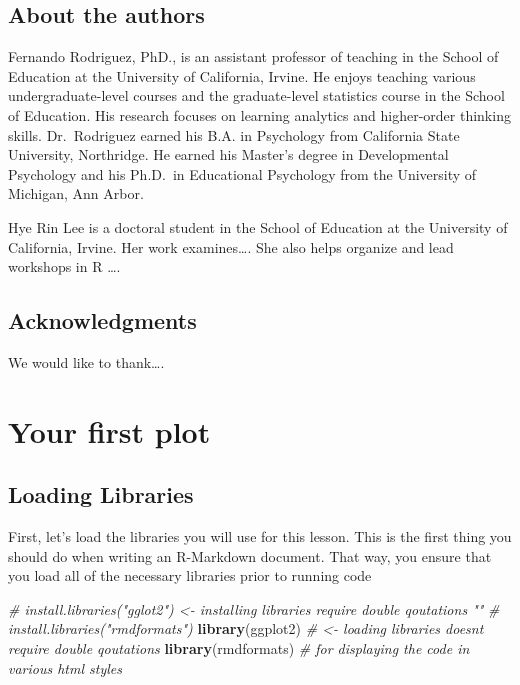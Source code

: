 \documentclass[
]{book}
\newenvironment{Shaded}{\begin{snugshade}}{\end{snugshade}}
\newcommand{\CommentTok}[1]{\textcolor[rgb]{0.56,0.35,0.01}{\textit{#1}}}
\newcommand{\KeywordTok}[1]{\textcolor[rgb]{0.13,0.29,0.53}{\textbf{#1}}}
\newcommand{\NormalTok}[1]{#1}
\begin{document}
\hypertarget{about-the-authors}{%
\section{About the authors}\label{about-the-authors}}

Fernando Rodriguez, PhD., is an assistant professor of teaching in the School of Education at the University of California, Irvine. He enjoys teaching various undergraduate-level courses and the graduate-level statistics course in the School of Education. His research focuses on learning analytics and higher-order thinking skills. Dr.~Rodriguez earned his B.A. in Psychology from California State University, Northridge. He earned his Master's degree in Developmental Psychology and his Ph.D.~in Educational Psychology from the University of Michigan, Ann Arbor.

Hye Rin Lee is a doctoral student in the School of Education at the University of California, Irvine. Her work examines\ldots. She also helps organize and lead workshops in R \ldots.

\hypertarget{acknowledgments}{%
\section{Acknowledgments}\label{acknowledgments}}

We would like to thank\ldots.

\hypertarget{your-first-plot}{%
\chapter{Your first plot}\label{your-first-plot}}

\hypertarget{loading-libraries}{%
\section{Loading Libraries}\label{loading-libraries}}

First, let's load the libraries you will use for this lesson. This is the first
thing you should do when writing an R-Markdown document. That way, you ensure
that you load all of the necessary libraries prior to running code

\begin{Shaded}
\begin{Highlighting}[]
\CommentTok{\# install.libraries("gglot2") \textless{}{-} installing libraries require double qoutations ""}
\CommentTok{\# install.libraries("rmdformats")}
\KeywordTok{library}\NormalTok{(ggplot2) }\CommentTok{\# \textless{}{-} loading libraries doesn\textquotesingle{}t require double qoutations}
\KeywordTok{library}\NormalTok{(rmdformats) }\CommentTok{\# for displaying the code in various html styles}
\end{Highlighting}
\end{Shaded}
\end{document}
